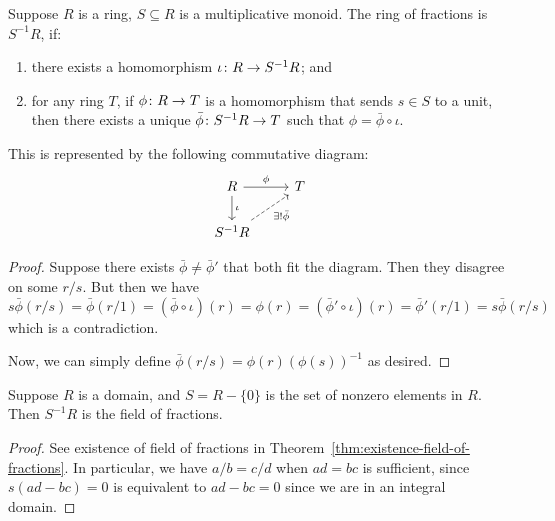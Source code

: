 \begin{theorem}
    Suppose \(R\) is a ring, \(S \subseteq R\) is a multiplicative monoid.
    The ring of fractions is \(S^{-1}R\), if:
    \begin{enumerate}[label={(\roman*)}, itemsep=0mm]
        \item there exists a homomorphism \(\iota\colon R\to S^{-1}R\); and
        \item for any ring \(T\), if \(\phi\colon R\to T\) is a homomorphism that sends \(s \in S\) to a unit,
            then there exists a unique \(\bar{\phi}\colon S^{-1}R\to T\)
            such that \(\phi = \bar{\phi}\circ\iota\).
    \end{enumerate}
    
    This is represented by the following commutative diagram:
    \begin{equation*}
        \begin{tikzcd}
            R \arrow{r}{\phi} \arrow{d}{\iota} & T \\
            S^{-1}R \arrow[dashrightarrow]{ur}[swap]{\exists!\bar{\phi}}
        \end{tikzcd}
    \end{equation*}
\end{theorem}
\begin{proof}
    Suppose there exists \(\bar{\phi}\neq\bar{\phi}'\) that both fit the diagram.
    Then they disagree on some \(r/s\).
    But then we have
    \begin{equation*}
        s\bar{\phi}(r/s) = \bar{\phi}(r/1) = (\bar{\phi}\circ\iota)(r)
        = \phi(r) = (\bar{\phi}'\circ\iota)(r) = \bar{\phi}'(r/1) = s\bar{\phi}(r/s)
    \end{equation*}
    which is a contradiction.

    Now, we can simply define \(\bar{\phi}(r/s) = \phi(r){(\phi(s))}^{-1}\) as desired.
\end{proof}

\begin{proposition}
    Suppose \(R\) is a domain, and \(S = R - \{0\}\) is the set of nonzero elements in \(R\).
    Then \(S^{-1}R\) is the field of fractions.
\end{proposition}
\begin{proof}
    See existence of field of fractions in Theorem~\ref{thm:existence-field-of-fractions}.
    In particular, we have \(a/b = c/d\) when \(ad = bc\) is sufficient,
    since \(s(ad - bc) = 0\) is equivalent to \(ad - bc = 0\) since we are in an integral domain.
\end{proof}

